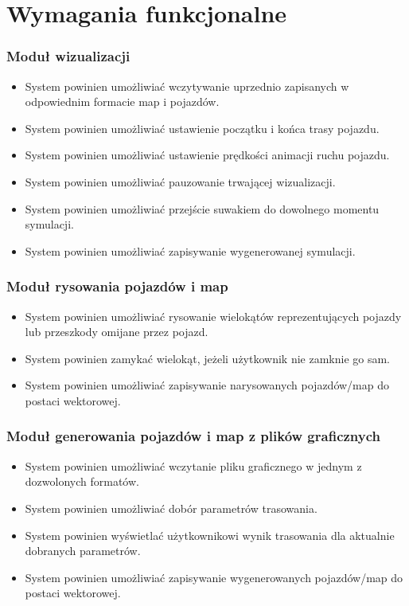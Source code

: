 \documentclass{article}
\let\oldsection\section
\renewcommand\section{\clearpage\oldsection} %
\begin{document}
\section{Wymagania funkcjonalne}

\subsubsection{Moduł wizualizacji}
\begin{itemize}
  \item System powinien umożliwiać wczytywanie uprzednio zapisanych w odpowiednim formacie map i pojazdów.
  \item System powinien umożliwiać ustawienie początku i końca trasy pojazdu.
  \item System powinien umożliwiać ustawienie prędkości animacji ruchu pojazdu.
  \item System powinien umożliwiać pauzowanie trwającej wizualizacji.
  \item System powinien umożliwiać przejście suwakiem do dowolnego momentu symulacji.
  \item System powinien umożliwiać zapisywanie wygenerowanej symulacji.
\end{itemize}

\subsubsection{Moduł rysowania pojazdów i map}
\begin{itemize}
  \item System powinien umożliwiać rysowanie wielokątów reprezentujących pojazdy lub przeszkody omijane przez pojazd.
  \item System powinien zamykać wielokąt, jeżeli użytkownik nie zamknie go sam.
  \item System powinien umożliwiać zapisywanie narysowanych pojazdów/map do postaci wektorowej.
\end{itemize}

\subsubsection{Moduł generowania pojazdów i map z plików graficznych}
\begin{itemize}
  \item System powinien umożliwiać wczytanie pliku graficznego w jednym z dozwolonych formatów.
  \item System powinien umożliwiać dobór parametrów trasowania.
  \item System powinien wyświetlać użytkownikowi wynik trasowania dla aktualnie dobranych parametrów.
  \item System powinien umożliwiać zapisywanie wygenerowanych pojazdów/map do postaci wektorowej.
\end{itemize}
\end{document}
